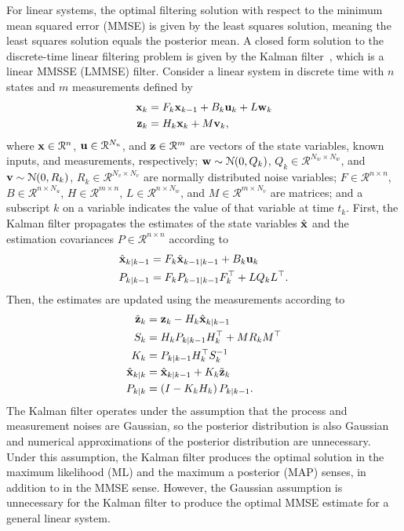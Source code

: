 \documentclass[../zhang_thesis.tex]{subfiles}
\begin{document}
For linear systems, the optimal filtering solution with respect to the minimum mean squared error (MMSE) is given by the least squares solution, meaning the least squares solution equals the posterior mean. A closed form solution to the discrete-time linear filtering problem is given by the Kalman filter~\cite{kalman60}, which is a linear MMSSE (LMMSE) filter. Consider a linear system in discrete time with $n$ states and $m$ measurements defined by
\begin{align}
    \mathbf{x}_k &= F_k \mathbf{x}_{k-1} + B_k \mathbf{u}_k + L \mathbf{w}_k \\
    \mathbf{z}_k &= H_k \mathbf{x}_k + M \mathbf{v}_k,
\end{align}
where $\mathbf{x}\in\mathcal{R}^n$, $\mathbf{u}\in\mathcal{R}^{N_u}$, and $\mathbf{z}\in\mathcal{R}^m$ are vectors of the state variables, known inputs, and measurements, respectively; $\mathbf{w}\sim\mathcal{N}(0,Q_k)$, $Q_k\in\mathcal{R}^{N_w\times N_w}$, and $\mathbf{v}\sim\mathcal{N}(0,R_k)$, $R_k\in\mathcal{R}^{N_v\times N_v}$ are normally distributed noise variables; $F\in\mathcal{R}^{n\times n}$, $B\in\mathcal{R}^{n\times N_u}$, $H\in\mathcal{R}^{m\times n}$, $L\in\mathcal{R}^{n\times N_w}$, and $M\in\mathcal{R}^{m\times N_v}$ are matrices; and a subscript $k$ on a
variable indicates the value of that variable at time $t_k$. First, the Kalman filter propagates the estimates of the state variables $\hat{\mathbf{x}}$ and the estimation covariances $P\in\mathcal{R}^{n\times n}$ according to
\begin{align}
    \hat{\mathbf{x}}_{k|k-1} &= F_k \hat{\mathbf{x}}_{k-1|k-1} + B_k \mathbf{u}_k \label{eq:kfp1} \\
    P_{k|k-1} &= F_k P_{k-1|k-1} F_k^\top + L Q_k L^\top. \label{eq:kfp2}
\end{align}
Then, the estimates are updated using the measurements according to
\begin{align}
    \tilde{\mathbf{z}}_k &= \mathbf{z}_k - H_k \hat{\mathbf{x}}_{k|k-1} \label{eq:kfu1} \\
    S_k &= H_k P_{k|k-1} H_k^\top + M R_k M^\top \\
    K_k &= P_{k|k-1} H_k^\top S_k^{-1} \\
    \hat{\mathbf{x}}_{k|k} &= \hat{\mathbf{x}}_{k|k-1} + K_k \tilde{\mathbf{z}}_k \\
    P_{k|k} &= \left( I - K_k H_k \right) P_{k|k-1}. \label{eq:kful} 
\end{align}
The Kalman filter operates under the assumption that the process and measurement noises are Gaussian, so the posterior distribution is also Gaussian and numerical approximations of the posterior distribution are unnecessary. Under this assumption, the Kalman filter produces the optimal solution in the maximum likelihood (ML) and the maximum a posterior (MAP) senses, in addition to in the MMSE sense. However, the Gaussian assumption is unnecessary for the Kalman filter to produce the
optimal MMSE estimate for a general linear system.
\end{document}
